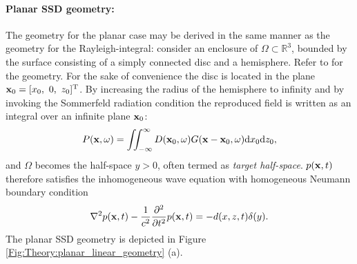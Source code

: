 \paragraph{Planar SSD geometry:}
The geometry for the planar case may be derived in the same manner as the geometry for the Rayleigh-integral: consider an enclosure of $\Omega \subset \mathbb{R}^3$, bounded by the surface consisting of a simply connected disc and a hemisphere. Refer to \cite[p.~84,p.~275]{Ahrens2012, Williams1999} for the geometry. For the sake of convenience the disc is located in the plane $\mathbf{x}_0 = [x_0,\ 0,\ z_0]^{\mathrm{T}}$. By increasing the radius of the hemisphere to infinity and by invoking the Sommerfeld radiation condition the reproduced field is written as an integral over an infinite plane $\mathbf{x}_0$:
\begin{equation}
P(\mathbf{x},\omega) = \iint_{-\infty}^{\infty} D(\mathbf{x}_0,\omega) G(\mathbf{x} - \mathbf{x}_0 , \omega ) \mathrm{d} x_0 \mathrm{d} z_0,
\label{Eq:Theory:3D_planar_SFS}
\end{equation}
and $\Omega$ becomes the half-space $y>0$, often termed as \emph{target half-space}.
$p(\mathbf{x},t)$ therefore satisfies the inhomogeneous wave equation with homogeneous Neumann boundary condition
\begin{equation}
\nabla^2 p(\mathbf{x},t) - \frac{1}{c^2}\frac{\partial^2}{\partial t^2} p(\mathbf{x},t) = - d(x,z,t)\delta(y).
\label{Eq:Theory:3D_planar_SFS_time}
\end{equation}
The planar SSD geometry is depicted in Figure \ref{Fig:Theory:planar_linear_geometry} (a).

